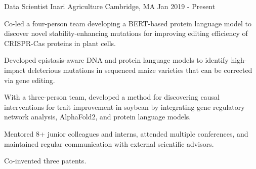 

\begin{cventries}

  \cventry
    {Data Scientist} %
    {Inari Agriculture} %
    {Cambridge, MA} %
    {Jan 2019 - Present} %
    {
      \begin{cvitems} %
        \item {Co-led a four-person team developing a BERT-based protein language model to discover novel stability-enhancing mutations for improving editing efficiency of CRISPR-Cas proteins in plant cells.}
        \item {Developed epistasis-aware DNA and protein language models to identify high-impact deleterious mutations in sequenced maize varieties that can be corrected via gene editing.}
        \item {With a three-person team, developed a method for discovering causal interventions for trait improvement in soybean by integrating gene regulatory network analysis, AlphaFold2, and protein language models.}
        \item {Mentored 8+ junior colleagues and interns, attended multiple conferences, and maintained regular communication with external scientific advisors.}
        \item {Co-invented three patents.}
      \end{cvitems}
    }


\end{cventries}
